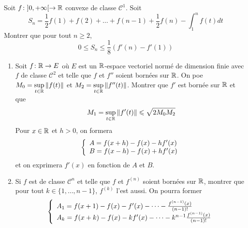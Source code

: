 \begin{exercise}
	Soit $f\colon]0,+\infty[\to\mathbb{R}$ convexe de classe $\mathcal{C}^{1}$. Soit 
	$$S_{n}=\frac{1}{2}f(1)+f(2)+\dots+f(n-1)+\frac{1}{2}f(n)-\int_{1}^{n}f(t)dt$$
	Montrer que pour tout $n\geqslant2$, 
	$$0\leqslant S_{n}\leqslant\frac{1}{8}(f'(n)-f'(1))$$
\end{exercise}

\begin{exercise}
	\phantom{}
	\begin{enumerate}
		\item Soit $f\colon\mathbb{R}\to E$ où $E$ est un $\mathbb{R}$-espace vectoriel normé de dimension finie avec $f$ de classe $\mathcal{C}^{2}$ et telle que $f$ et $f''$ soient bornées sur $\mathbb{R}$. On poe $M_{0}=\sup\limits_{t\in\mathbb{R}}\Vert f(t)\Vert$ et $M_{2}=\sup\limits_{t\in\mathbb{R}}\Vert f''(t)\Vert$. Montrer que $f'$ est bornée sur $\mathbb{R}$ et que 
		$$M_{1}=\sup\limits_{t\in\mathbb{R}}\Vert f'(t)\Vert\leqslant\sqrt{2M_{0}M_{2}}$$
		Pour $x\in\mathbb{R}$ et $h>0$, on formera 
		$$
		\left\{
			\begin{array}[]{l}
				A=f(x+h)-f(x)-hf'(x)\\
				B=f(x-h)-f(x)+hf'(x)
			\end{array}
		\right.
		$$
		et on exprimera $f'(x)$ en fonction de $A$ et $B$.

		\item Si $f$ est de classe $\mathcal{C}^{n}$ et telle que $f$ et $f^{(n)}$ soient bornées sur $\mathbb{R}$, montrer que pour tout $k\in\{1,\dots,n-1\}$, $f^{(k)}$ l'est aussi. On pourra former 
		$$
		\left\{
			\begin{array}[]{l}
				A_{1}=f(x+1)-f(x)-f'(x)-\dots-\frac{f^{(n-1)}(x)}{(n-1)!}\\
				A_{k}=f(x+k)-f(x)-kf'(x)-\dots-k^{n-1}\frac{f^{(n-1)}(x)}{(n-1)!}
			\end{array}
		\right.
		$$
	\end{enumerate}
\end{exercise}

